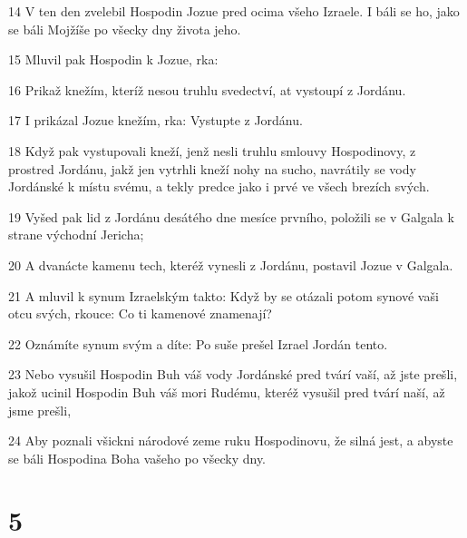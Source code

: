 \par 14 V ten den zvelebil Hospodin Jozue pred ocima všeho Izraele. I báli se ho, jako se báli Mojžíše po všecky dny života jeho.
\par 15 Mluvil pak Hospodin k Jozue, rka:
\par 16 Prikaž knežím, kteríž nesou truhlu svedectví, at vystoupí z Jordánu.
\par 17 I prikázal Jozue knežím, rka: Vystupte z Jordánu.
\par 18 Když pak vystupovali kneží, jenž nesli truhlu smlouvy Hospodinovy, z prostred Jordánu, jakž jen vytrhli kneží nohy na sucho, navrátily se vody Jordánské k místu svému, a tekly predce jako i prvé ve všech brezích svých.
\par 19 Vyšed pak lid z Jordánu desátého dne mesíce prvního, položili se v Galgala k strane východní Jericha;
\par 20 A dvanácte kamenu tech, kteréž vynesli z Jordánu, postavil Jozue v Galgala.
\par 21 A mluvil k synum Izraelským takto: Když by se otázali potom synové vaši otcu svých, rkouce: Co ti kamenové znamenají?
\par 22 Oznámíte synum svým a díte: Po suše prešel Izrael Jordán tento.
\par 23 Nebo vysušil Hospodin Buh váš vody Jordánské pred tvárí vaší, až jste prešli, jakož ucinil Hospodin Buh váš mori Rudému, kteréž vysušil pred tvárí naší, až jsme prešli,
\par 24 Aby poznali všickni národové zeme ruku Hospodinovu, že silná jest, a abyste se báli Hospodina Boha vašeho po všecky dny.

\chapter{5}

